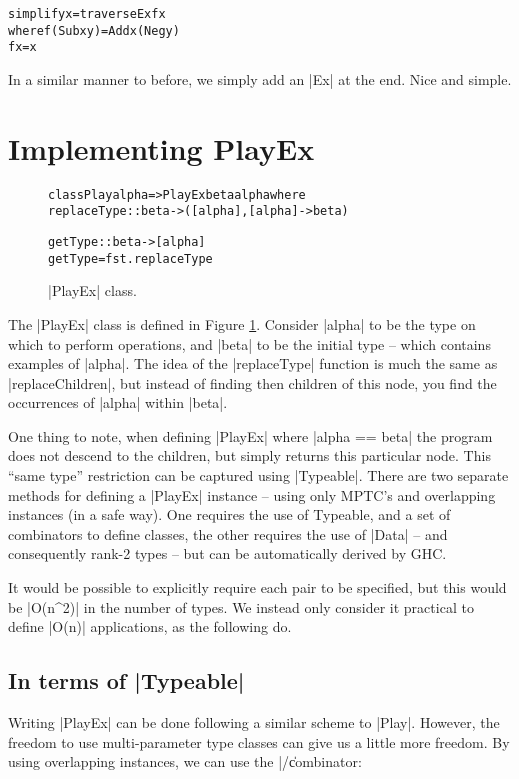 \documentclass[preprint]{sigplanconf}
\newenvironment{code}{\begin{alltt}\small}{\end{alltt}}
\begin{document}
\begin{code}
simplify x = traverseEx f x
    where  f (Sub x y)  = Add x (Neg y)
           f x          = x
\end{code}

In a similar manner to before, we simply add an |Ex| at the end. Nice and simple.


\section{Implementing PlayEx}


\begin{figure}
\begin{code}
class Play alpha => PlayEx beta alpha where
    replaceType :: beta -> ([alpha], [alpha] -> beta)

    getType :: beta -> [alpha]
    getType = fst . replaceType
\end{code}
\caption{|PlayEx| class.}
\label{fig:playex}
\end{figure}


The |PlayEx| class is defined in Figure \ref{fig:playex}. Consider |alpha| to be the type on which to perform operations, and |beta| to be the initial type -- which contains examples of |alpha|. The idea of the |replaceType| function is much the same as |replaceChildren|, but instead of finding then children of this node, you find the occurrences of |alpha| within |beta|.

One thing to note, when defining |PlayEx| where |alpha == beta| the program does not descend to the children, but simply returns this particular node. This ``same type'' restriction can be captured using |Typeable|. There are two separate methods for defining a |PlayEx| instance -- using only MPTC's and overlapping instances (in a safe way). One requires the use of Typeable, and a set of combinators to define classes, the other requires the use of |Data| -- and consequently rank-2 types -- but can be automatically derived by GHC.

It would be possible to explicitly require each pair to be specified, but this would be |O(n^2)| in the number of types. We instead only consider it practical to define |O(n)| applications, as the following do.

\subsection{In terms of |Typeable|}


Writing |PlayEx| can be done following a similar scheme to |Play|. However, the freedom to use multi-parameter type classes can give us a little more freedom. By using overlapping instances, we can use the |/\| combinator:
\end{document}
